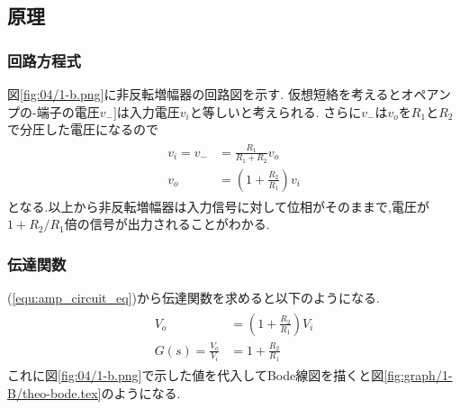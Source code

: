 \subsection{原理}
\subsubsection{回路方程式}
図\ref{fig:04/1-b.png}に非反転増幅器の回路図を示す.
仮想短絡を考えるとオペアンプの-端子の電圧$v_{-}]$は入力電圧$v_i$と等しいと考えられる.
さらに$v_-$は$v_o$を$R_1$と$R_2$で分圧した電圧になるので
\begin{align}
  \begin{split}
    \label{equ:amp_circuit_eq}
    v_i=v_-&=\frac{R_1}{R_1+R_2}v_o\\
    v_o&=\left(1+\frac{R_2}{R_1}\right)v_i
  \end{split}
\end{align}
となる.以上から非反転増幅器は入力信号に対して位相がそのままで,電圧が$1+R_2/R_1$倍の信号が出力されることがわかる.
\subsubsection{伝達関数}
(\ref{equ:amp_circuit_eq})から伝達関数を求めると以下のようになる.
\begin{align}
  \begin{split}
    V_o&=\left(1+\frac{R_2}{R_1}\right)V_i\\
    G(s)=\frac{V_o}{V_i}&=1+\frac{R_2}{R_1}
  \end{split}
\end{align}
これに図\ref{fig:04/1-b.png}で示した値を代入してBode線図を描くと図\ref{fig:graph/1-B/theo-bode.tex}のようになる.
